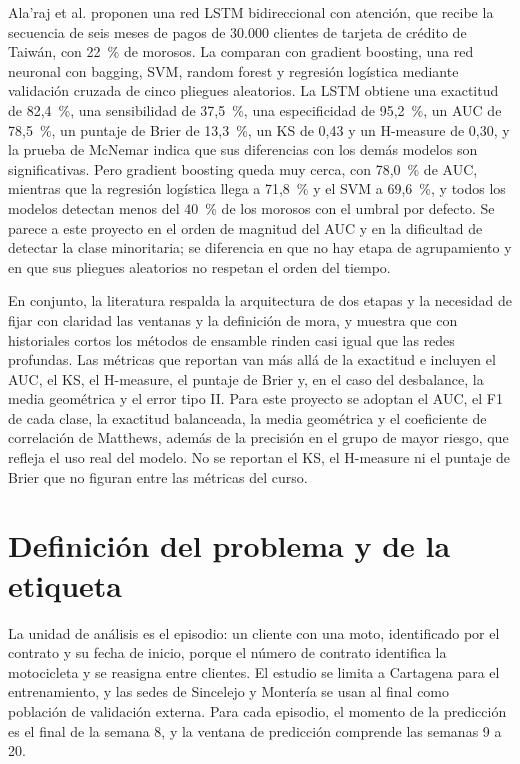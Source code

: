 \documentclass[journal]{IEEEtran}
\begin{document}
Ala'raj et al. \cite{alaraj2021} proponen una red LSTM bidireccional con atención, que recibe la secuencia de seis meses de pagos de 30.000 clientes de tarjeta de crédito de Taiwán, con 22~\% de morosos. La comparan con gradient boosting, una red neuronal con bagging, SVM, random forest y regresión logística mediante validación cruzada de cinco pliegues aleatorios. La LSTM obtiene una exactitud de 82,4~\%, una sensibilidad de 37,5~\%, una especificidad de 95,2~\%, un AUC de 78,5~\%, un puntaje de Brier de 13,3~\%, un KS de 0,43 y un H-measure de 0,30, y la prueba de McNemar indica que sus diferencias con los demás modelos son significativas. Pero gradient boosting queda muy cerca, con 78,0~\% de AUC, mientras que la regresión logística llega a 71,8~\% y el SVM a 69,6~\%, y todos los modelos detectan menos del 40~\% de los morosos con el umbral por defecto. Se parece a este proyecto en el orden de magnitud del AUC y en la dificultad de detectar la clase minoritaria; se diferencia en que no hay etapa de agrupamiento y en que sus pliegues aleatorios no respetan el orden del tiempo.

En conjunto, la literatura respalda la arquitectura de dos etapas y la necesidad de fijar con claridad las ventanas y la definición de mora, y muestra que con historiales cortos los métodos de ensamble rinden casi igual que las redes profundas. Las métricas que reportan van más allá de la exactitud e incluyen el AUC, el KS, el H-measure, el puntaje de Brier y, en el caso del desbalance, la media geométrica y el error tipo II. Para este proyecto se adoptan el AUC, el F1 de cada clase, la exactitud balanceada, la media geométrica y el coeficiente de correlación de Matthews, además de la precisión en el grupo de mayor riesgo, que refleja el uso real del modelo. No se reportan el KS, el H-measure ni el puntaje de Brier que no figuran entre las métricas del curso.

\section{Definición del problema y de la etiqueta}

La unidad de análisis es el episodio: un cliente con una moto, identificado por el contrato y su fecha de inicio, porque el número de contrato identifica la motocicleta y se reasigna entre clientes. El estudio se limita a Cartagena para el entrenamiento, y las sedes de Sincelejo y Montería se usan al final como población de validación externa. Para cada episodio, el momento de la predicción es el final de la semana 8, y la ventana de predicción comprende las semanas 9 a 20.
\end{document}
